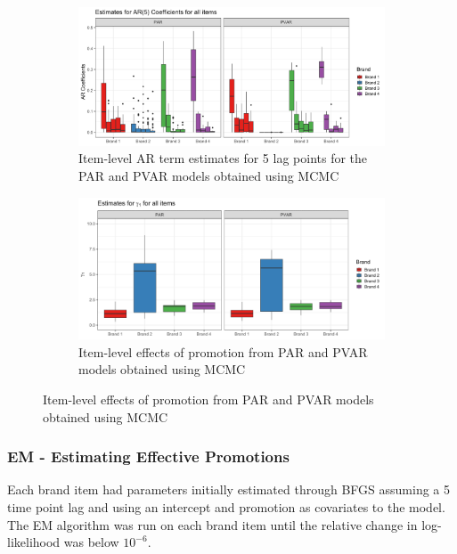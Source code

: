 \documentclass{article}
\begin{document}
\begin{figure}
    \centering
     \begin{subfigure}[b]{0.48\textwidth}
         \centering
        \includegraphics[width=1\linewidth]{figures/Bios735-AR-Estimates.png}
        \caption{Item-level AR term estimates for 5 lag points for the PAR and PVAR models obtained using MCMC}
        \label{fig:AR-Est}
    \end{subfigure}
    \hfill
     \begin{subfigure}[b]{0.48\textwidth}
         \centering
         \includegraphics[width=1\textwidth]{figures/Bios735-Promotion-Effect-estimate.png}
         \caption{Item-level effects of promotion from PAR and PVAR models obtained using MCMC}
         \label{fig:Promo-Est}
     \end{subfigure}
\end{figure}

\subsubsection{EM - Estimating Effective Promotions}

\noindent Each brand item had parameters initially estimated through BFGS assuming a 5 time point lag and using an intercept and promotion as covariates to the model. The EM algorithm was run on each brand item until the relative change in log-likelihood was below $10^{-6}$. 
\end{document}
